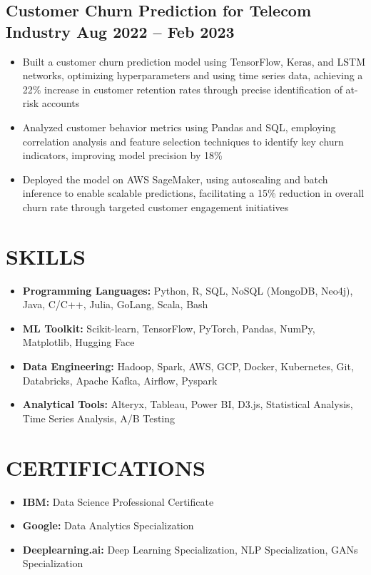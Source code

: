 \documentclass[12pt,a4paper]{article}
\begin{document}
\subsection*{Customer Churn Prediction for Telecom Industry \hfill Aug 2022 – Feb 2023}
\begin{itemize}[leftmargin=*,noitemsep,topsep=0pt]
\item Built a customer churn prediction model using TensorFlow, Keras, and LSTM networks, optimizing hyperparameters and using time series data, achieving a 22\% increase in customer retention rates through precise identification of at-risk accounts
\item Analyzed customer behavior metrics using Pandas and SQL, employing correlation analysis and feature selection techniques to identify key churn indicators, improving model precision by 18\% 
\item Deployed the model on AWS SageMaker, using autoscaling and batch inference to enable scalable predictions, facilitating a 15\% reduction in overall churn rate through targeted customer engagement initiatives
\end{itemize}


\section*{SKILLS}
\begin{itemize}[leftmargin=*,noitemsep,topsep=0pt]
\item \textbf{Programming Languages:} Python, R, SQL, NoSQL (MongoDB, Neo4j), Java, C/C++, Julia, GoLang, Scala, Bash
\item \textbf{ML Toolkit:} Scikit-learn, TensorFlow, PyTorch, Pandas, NumPy, Matplotlib, Hugging Face
\item \textbf{Data Engineering:} Hadoop, Spark, AWS, GCP, Docker, Kubernetes, Git, Databricks, Apache Kafka, Airflow, Pyspark
\item \textbf{Analytical Tools:} Alteryx, Tableau, Power BI, D3.js, Statistical Analysis, Time Series Analysis, A/B Testing
\end{itemize}

\section*{CERTIFICATIONS}
\begin{itemize}[leftmargin=*,noitemsep,topsep=0pt]
\item \textbf{IBM:} Data Science Professional Certificate
\item \textbf{Google:} Data Analytics Specialization
\item \textbf{Deeplearning.ai:} Deep Learning Specialization, NLP Specialization, GANs Specialization
\end{itemize}
\end{document}
